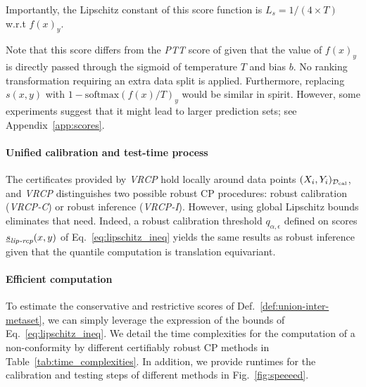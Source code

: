 Importantly, the Lipschitz constant of this score function is $L_s = 1 / (4 \times T)$ w.r.t $f(x)_y$. 

Note that this score differs from the \emph{PTT} score of \cite{rscp} given that the value of $f(x)_y$ is directly passed through the sigmoid of temperature $T$ and bias $b$. No ranking transformation requiring an extra data split is applied. Furthermore, replacing $s(x,y)$ with $1-\text{softmax}(f(x)/T)_y$ would be similar in spirit. However, some experiments suggest that it might lead to larger prediction sets; see Appendix~\ref{app:scores}.

\paragraph{Unified calibration and test-time process} The certificates provided by \emph{VRCP} hold locally around data points $(X_i,Y_i)_{\mathcal{D}_\mathrm{cal}}$, and \emph{VRCP} distinguishes two possible robust CP procedures: robust calibration (\emph{VRCP-C}) or robust inference (\emph{VRCP-I}). However, using global Lipschitz bounds eliminates that need. Indeed, a robust calibration threshold $q_{\alpha,\epsilon}$ defined on scores $\underline{s}_\emph{lip-rcp}(x,y)$ of Eq.~\eqref{eq:lipschitz_ineq} 
yields the same results as robust inference given that the quantile computation is translation equivariant.


\paragraph{Efficient computation} To estimate the conservative and restrictive scores of Def.~\ref{def:union-inter-metaset}, we can simply leverage the expression of the bounds of Eq.~\ref{eq:lipschitz_ineq}. We detail the time complexities for the computation of a non-conformity by different certifiably robust CP methods in Table~\ref{tab:time_complexities}. In addition, we provide runtimes for the calibration and testing steps of different methods in Fig.~\ref{fig:speeeed}.

